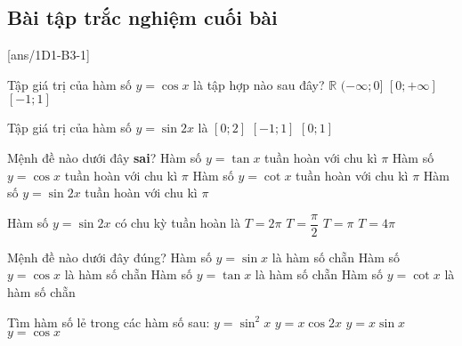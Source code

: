\subsection{Bài tập trắc nghiệm cuối bài}
\TN
\setcounter{ex}{0}
[ans/1D1-B3-1]
\begin{ex}%
	Tập giá trị của hàm số $y= \cos x$ là tập hợp nào sau đây?
	\choice
	{$\mathbb{R}$}
	{$(-\infty; 0]$}
	{$[0; +\infty]$}
	{\True $ [-1; 1]$}
\end{ex}

\begin{ex}%
	Tập giá trị của hàm số $y=\sin 2x$ là
	\choice{$[-2;2]$}
	{$[0;2]$}
	{\True $[-1;1]$}
	{$[0;1]$}
\end{ex}

\begin{ex}%
	Mệnh đề nào dưới đây \textbf{sai}?
	\choice
	{Hàm số $y=\tan x$ tuần hoàn với chu kì $\pi$}
	{\True Hàm số $y=\cos x$ tuần hoàn với chu kì $\pi$}
	{Hàm số $y=\cot x$ tuần hoàn với chu kì $\pi$}
	{Hàm số $y=\sin2x$ tuần hoàn với chu kì $\pi$}
\end{ex}

\begin{ex}%
	Hàm số $y=\sin 2x$ có chu kỳ tuần hoàn là
	\choice
	{$T=2\pi$}
	{$T=\dfrac{\pi}{2}$}
	{\True $T=\pi$}
	{$T=4\pi$}
\end{ex}

\begin{ex}%
	Mệnh đề nào dưới đây đúng?
	\choice
	{Hàm số $y=\sin x$ là hàm số chẵn}
	{\True Hàm số $y=\cos x$ là hàm số chẵn}
	{Hàm số $y=\tan x$ là hàm số chẵn}
	{Hàm số $y=\cot x$ là hàm số chẵn}
\end{ex}

\begin{ex}%
	Tìm hàm số lẻ trong các hàm số sau:
	\choice
	{$y=\sin^2x$}
	{\True $y=x\cos2x$}
	{ $y=x\sin x$}
	{$y=\cos x$}	
	
\end{ex}


